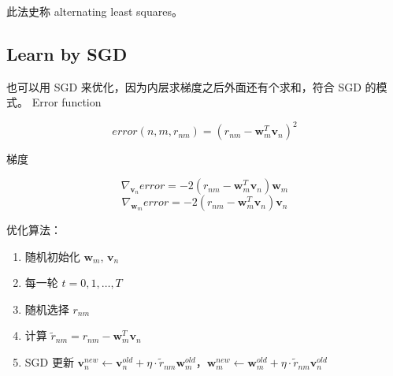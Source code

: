 \documentclass[a4paper]{article}
\begin{document}
此法史称 alternating least squares。

\subsection{Learn by SGD}
也可以用 SGD 来优化，因为内层求梯度之后外面还有个求和，符合 SGD 的模式。
Error function

$$error(n, m, r_{nm}) = (r_{nm} - \mathbf{w}_m^T\mathbf{v}_n)^2$$

梯度

$$\nabla_{\mathbf{v}_n}error = -2(r_{nm}-\mathbf{w}_m^T\mathbf{v}_n)\mathbf{w}_m$$
$$\nabla_{\mathbf{w}_m}error = -2(r_{nm}-\mathbf{w}_m^T\mathbf{v}_n)\mathbf{v}_n$$

优化算法：

\begin{enumerate}
  \item 随机初始化 $\mathbf{w}_m$, $\mathbf{v}_n$ \\
  \item 每一轮 $t = 0, 1, \dots, T$\\
  \item 随机选择 $r_{nm}$\\
  \item 计算 $\tilde{r}_{nm} = r_{nm} - \mathbf{w}_m^T\mathbf{v}_n$\\
  \item SGD 更新 $\mathbf{v}_n^{new} \leftarrow \mathbf{v}_n^{old} + \eta \cdot \tilde{r}_{nm}\mathbf{w}_{m}^{old}$，$\mathbf{w}_m^{new} \leftarrow \mathbf{w}_m^{old} + \eta \cdot \tilde{r}_{nm}\mathbf{v}_{n}^{old}$
\end{enumerate}
\end{document}
